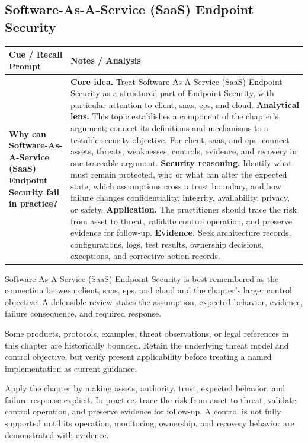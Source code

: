 \documentclass[11pt]{article}
\newcommand{\CornellHeader}{%
\rowcolor{Navy}\color{white}\bfseries Cue / Recall Prompt & \color{white}\bfseries Notes / Analysis\\\hline}
\newcommand{\CornellRow}[2]{%
\cellcolor{CueGray}\RaggedRight\textbf{#1} & \RaggedRight #2\\\hline}
\begin{document}
\subsection*{Software-As-A-Service (SaaS) Endpoint Security}
\begin{longtable}{>{\RaggedRight\arraybackslash}p{}|>{\RaggedRight\arraybackslash}p{}}
\CornellHeader
\CornellRow{Why can Software-As-A-Service (SaaS) Endpoint Security fail in practice?}{\textbf{Core idea.} Treat Software-As-A-Service (SaaS) Endpoint Security as a structured part of Endpoint Security, with particular attention to client, saas, eps, and cloud. \textbf{Analytical lens.} This topic establishes a component of the chapter's argument; connect its definitions and mechanisms to a testable security objective. For client, saas, and eps, connect assets, threats, weaknesses, controls, evidence, and recovery in one traceable argument. \textbf{Security reasoning.} Identify what must remain protected, who or what can alter the expected state, which assumptions cross a trust boundary, and how failure changes confidentiality, integrity, availability, privacy, or safety. \textbf{Application.} The practitioner should trace the risk from asset to threat, validate control operation, and preserve evidence for follow-up. \textbf{Evidence.} Seek architecture records, configurations, logs, test results, ownership decisions, exceptions, and corrective-action records.}
\end{longtable}
\begin{topicsummary}
Software-As-A-Service (SaaS) Endpoint Security is best remembered as the connection between client, saas, eps, and cloud and the chapter's larger control objective. A defensible review states the assumption, expected behavior, evidence, failure consequence, and required response.
\end{topicsummary}
\begin{historybox}
Some products, protocols, examples, threat observations, or legal references in this chapter are historically bounded. Retain the underlying threat model and control objective, but verify present applicability before treating a named implementation as current guidance.
\end{historybox}
\begin{defensebox}
Apply the chapter by making assets, authority, trust, expected behavior, and failure response explicit. In practice, trace the risk from asset to threat, validate control operation, and preserve evidence for follow-up. A control is not fully supported until its operation, monitoring, ownership, and recovery behavior are demonstrated with evidence.
\end{defensebox}
\end{document}
